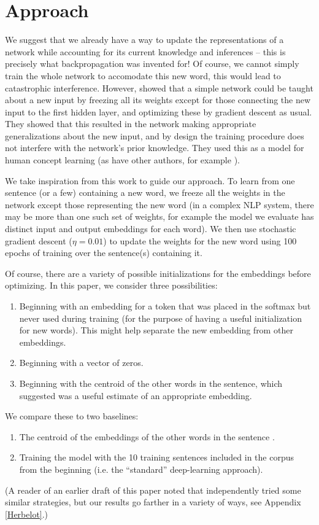 \documentclass{article}
\begin{document}
\section{Approach}
We suggest that we already have a way to update the representations of a network while accounting for its current knowledge and inferences -- this is precisely what backpropagation was invented for! Of course, we cannot simply train the whole network to accomodate this new word, this would lead to catastrophic interference. However, \citet{Rumelhart1993} showed that a simple network could be taught about a new input by freezing all its weights except for those connecting the new input to the first hidden layer, and optimizing these by gradient descent as usual. They showed that this resulted in the network making appropriate generalizations about the new input, and by design the training procedure does not interfere with the network's prior knowledge. They used this as a model for human concept learning (as have other authors, for example \citet{Rogers2004}). \par
We take inspiration from this work to guide our approach. To learn from one sentence (or a few) containing a new word, we freeze all the weights in the network except those representing the new word (in a complex NLP system, there may be more than one such set of weights, for example the model we evaluate has distinct input and output embeddings for each word). We then use stochastic gradient descent (\(\eta = 0.01\)) to update the weights for the new word using 100 epochs of training over the sentence(s) containing it. \par
Of course, there are a variety of possible initializations for the embeddings before optimizing. In this paper, we consider three possibilities: 
\vspace{-0.5em}
\begin{enumerate}
\setlength\itemsep{0em}
\item Beginning with an embedding for a token that was placed in the softmax but never used during training (for the purpose of having a useful initialization for new words). This might help separate the new embedding from other embeddings. 
\item Beginning with a vector of zeros.
\item Beginning with the centroid of the other words in the sentence, which \citet{Lazaridou2017} suggested was a useful estimate of an appropriate embedding.
\end{enumerate}
\vspace{-0.5em}
We compare these to two baselines:
\vspace{-0.5em}
\begin{enumerate}
\setlength\itemsep{0em}
\item The centroid of the embeddings of the other words in the sentence \citet{Lazaridou2017}. 
\item Training the model with the 10 training sentences included in the corpus from the beginning (i.e. the ``standard'' deep-learning approach).
\end{enumerate}
(A reader of an earlier draft of this paper noted that \cite{Herbelot2017} independently tried some similar strategies, but our results go farther in a variety of ways, see Appendix \ref{Herbelot}.)
\end{document}
